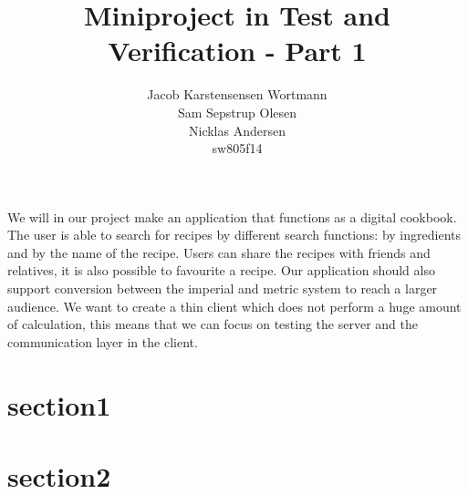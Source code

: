 \documentclass[a4paper,12pt]{memoir}
\title{Miniproject in Test and Verification - Part 1}
\author{Jacob Karstensensen Wortmann\\Sam Sepstrup Olesen\\Nicklas Andersen\\sw805f14}
\begin{document}
\maketitle %
We will in our project make an application that functions as a digital cookbook. The user is able to search for recipes by different search functions: by ingredients and by the name of the recipe. Users can share the recipes with friends and relatives, it is also possible to favourite a recipe. Our application should also support conversion between the imperial and metric system to reach a larger audience. 
We want to create a thin client which does not perform a huge amount of calculation, this means that we can focus on testing the server and the communication layer in the client.

\section{section1}
\section{section2}
\end{document}
